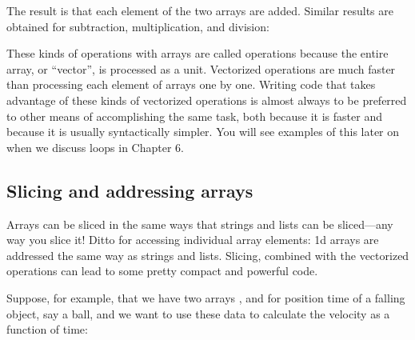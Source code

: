 \documentclass[letterpaper,10pt,english]{sphinxmanual}
\begin{document}
\sphinxAtStartPar
The result is that each element of the two arrays are added.  Similar results are obtained for subtraction, multiplication, and division:

\begin{sphinxVerbatim}[commandchars=\\\{\},numbers=left,firstnumber=1,stepnumber=1]
\PYG{p}{[}  \PYG{p}{]}

\PYG{p}{[}       \PYG{p}{]}

\PYG{p}{[}      \PYG{p}{]}
\end{sphinxVerbatim}

\sphinxAtStartPar
These kinds of operations with arrays are called  operations because the entire array, or “vector”, is processed as a unit.  Vectorized operations are much faster than processing each element of arrays one by one.  Writing code that takes advantage of these kinds of vectorized operations is almost always to be preferred to other means of accomplishing the same task, both because it is faster and because it is usually syntactically simpler.  You will see examples of this later on when we discuss loops in Chapter 6.


\subsection{Slicing and addressing arrays}
\label{\detokenize{chap3/chap3_arrays:slicing-and-addressing-arrays}}
\sphinxAtStartPar
Arrays can be sliced in the same ways that strings and lists can be sliced—any way you slice it!  Ditto for accessing individual array elements: 1\sphinxhyphen{}d arrays are addressed the same way as strings and lists.  Slicing, combined with the vectorized operations can lead to some pretty compact and powerful code.

\sphinxAtStartPar
Suppose, for example, that we have two arrays , and  for position  time of a falling object, say a ball, and we want to use these data to calculate the velocity as a function of time:
\end{document}
